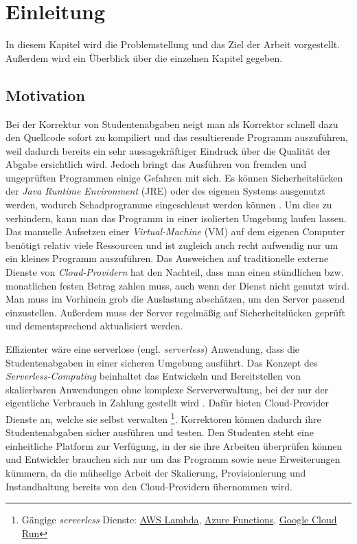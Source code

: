 \chapter{Einleitung}
In diesem Kapitel wird die Problemstellung und das Ziel der Arbeit vorgestellt.
Außerdem wird ein Überblick über die einzelnen Kapitel gegeben.

\section{Motivation}
Bei der Korrektur von Studentenabgaben neigt man als Korrektor schnell dazu den Quellcode sofort 
zu kompiliert und das resultierende Programm auszuführen, 
weil dadurch bereits ein sehr aussagekräftiger Eindruck über die Qualität der Abgabe ersichtlich wird. 
Jedoch bringt das Ausführen von fremden und ungeprüften Programmen einige Gefahren mit sich.
Es können Sicherheitslücken der \textit{Java Runtime Environment} (JRE) \cite{Jre}
oder des eigenen Systems ausgenutzt werden, wodurch Schadprogramme eingeschleust
werden können \cite{CveJreVuln}.
Um dies zu verhindern, kann man das Programm in einer isolierten Umgebung laufen lassen.
Das manuelle Aufsetzen einer \textit{Virtual-Machine} (VM) \cite{RedHatVM} auf dem eigenen Computer
benötigt relativ viele Ressourcen und ist zugleich auch recht aufwendig nur um ein kleines Programm auszuführen.
Das Ausweichen auf traditionelle externe Dienste von \textit{Cloud-Providern} hat den Nachteil,
dass man einen stündlichen bzw. monatlichen festen Betrag zahlen muss,
auch wenn der Dienst nicht genutzt wird. Man muss im Vorhinein grob die Auslastung abschätzen,
um den Server passend einzustellen. Außerdem muss der Server regelmäßig auf
Sicherheitslücken geprüft und dementsprechend aktualisiert werden.

Effizienter wäre eine serverlose (engl. \textit{serverless}) Anwendung, dass die Studentenabgaben in einer sicheren Umgebung ausführt.
Das Konzept des \textit{Serverless-Computing} beinhaltet das Entwickeln und Bereitstellen
von skalierbaren Anwendungen ohne komplexe Serververwaltung, bei der nur der eigentliche Verbrauch
in Zahlung gestellt wird \cite{CioGov}.
Dafür bieten Cloud-Provider Dienste an, welche sie selbst verwalten \footnote{
  Gängige \textit{serverless} Dienste:
  {\href{https://aws.amazon.com/de/lambda/}{AWS Lambda}},
  {\href{https://azure.microsoft.com/de-de/services/functions/}{Azure Functions}},
  {\href{https://cloud.google.com/run?hl=de}{Google Cloud Run}}
}.
Korrektoren können dadurch ihre Studentenabgaben sicher ausführen und testen.
Den Studenten steht eine einheitliche Platform zur Verfügung, in der sie ihre Arbeiten überprüfen können und
Entwickler brauchen sich nur um das Programm sowie neue Erweiterungen kümmern, da die mühselige Arbeit
der Skalierung, Provisionierung und Instandhaltung bereits von den Cloud-Providern übernommen wird.

